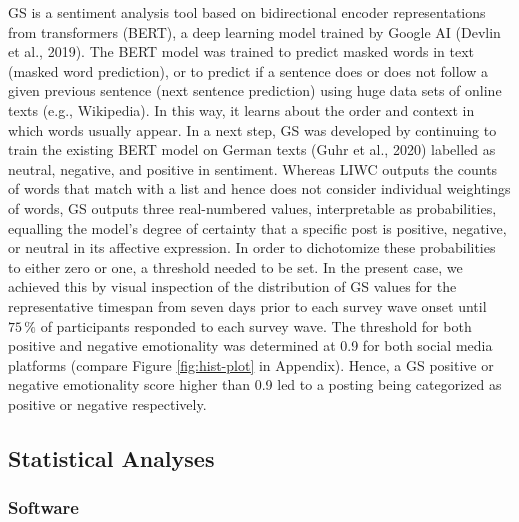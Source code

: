 \documentclass[
  english,
  jou,floatsintext]{apa7}
\begin{document}
GS is a sentiment analysis tool based on bidirectional encoder representations from transformers (BERT), a deep learning model trained by Google AI (Devlin et al., 2019). The BERT model was trained to predict masked words in text (masked word prediction), or to predict if a sentence does or does not follow a given previous sentence (next sentence prediction) using huge data sets of online texts (e.g., Wikipedia). In this way, it learns about the order and context in which words usually appear. In a next step, GS was developed by continuing to train the existing BERT model on German texts (Guhr et al., 2020) labelled as neutral, negative, and positive in sentiment. Whereas LIWC outputs the counts of words that match with a list and hence does not consider individual weightings of words, GS outputs three real-numbered values, interpretable as probabilities, equalling the model's degree of certainty that a specific post is positive, negative, or neutral in its affective expression. In order to dichotomize these probabilities to either zero or one, a threshold needed to be set. In the present case, we achieved this by visual inspection of the distribution of GS values for the representative timespan from seven days prior to each survey wave onset until \(75\,\%\) of participants responded to each survey wave. The threshold for both positive and negative emotionality was determined at 0.9 for both social media platforms (compare Figure \ref{fig:hist-plot} in Appendix). Hence, a GS positive or negative emotionality score higher than 0.9 led to a posting being categorized as positive or negative respectively.

\hypertarget{statistical-analyses}{%
\subsection{Statistical Analyses}\label{statistical-analyses}}

\hypertarget{software}{%
\subsubsection{Software}\label{software}}
\end{document}
